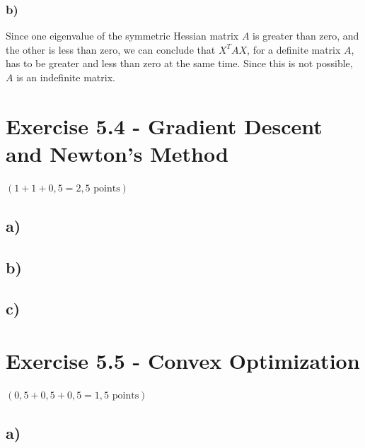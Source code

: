 \documentclass[a4paper]{article}
\begin{document}
        \subsubsection*{b)}
            Since one eigenvalue of the symmetric Hessian matrix $A$ is greater than zero, and the other is less than zero, we can conclude that $X^T A X$, for a definite matrix $A$, has to be greater and less than zero at the same time.
            Since this is not possible, $A$ is an indefinite matrix.
            


\newpage
\section*{Exercise 5.4 - Gradient Descent and Newton's Method}
$(1+1+0,5 = 2,5 \text{ points})$
    \subsection*{a)}
        
        
        
    \subsection*{b)}
        
        
        
    \subsection*{c)}
    
    



\newpage
\section*{Exercise 5.5 - Convex Optimization}
$(0,5+0,5+0,5 = 1,5 \text{ points})$
    \subsection*{a)}
        
        
        
\end{document}

